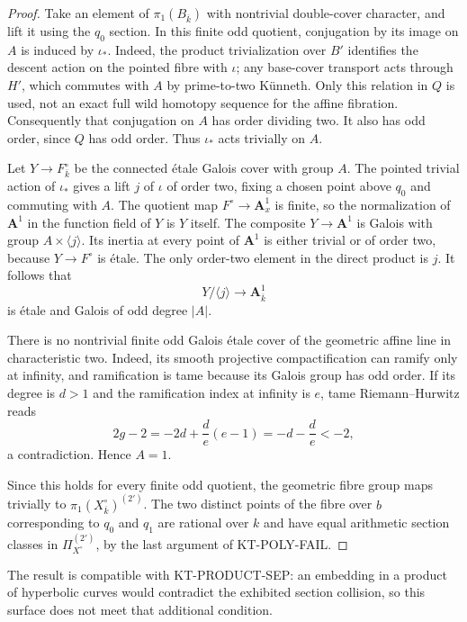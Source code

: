 \begin{proof}
Take an element of $\pi_1(B_{\overline k})$ with nontrivial
double-cover character, and lift it using the $q_0$ section.
In this finite odd quotient, conjugation by its image on $A$
is induced by $\iota_*$. Indeed, the product trivialization
over $B'$ identifies the descent action on the pointed fibre
with $\iota$; any base-cover transport acts through $H'$, which
commutes with $A$ by prime-to-two K\"unneth. Only this relation
in $Q$ is used, not an exact full wild homotopy sequence for
the affine fibration. Consequently that conjugation on $A$
has order dividing two. It also has odd order, since $Q$ has
odd order. Thus $\iota_*$ acts trivially on $A$.

Let $Y\to F^\circ_{\overline k}$ be the connected \'etale
Galois cover with group $A$. The pointed trivial action of
$\iota_*$ gives a lift $j$ of $\iota$ of order two, fixing a
chosen point above $q_0$ and commuting with $A$.
The quotient map $F^\circ\to\mathbf A^1_x$ is finite, so
the normalization of $\mathbf A^1$ in the function field of
$Y$ is $Y$ itself. The composite $Y\to\mathbf A^1$ is
Galois with group $A\times\langle j\rangle$. Its inertia
at every point of $\mathbf A^1$ is either trivial or of
order two, because $Y\to F^\circ$ is \'etale. The only
order-two element in the direct product is $j$.
It follows that
\[
 Y/\langle j\rangle\longrightarrow\mathbf A^1_{\overline k}
\]
is \'etale and Galois of odd degree $|A|$.

There is no nontrivial finite odd Galois \'etale cover of the
geometric affine line in characteristic two. Indeed, its
smooth projective compactification can ramify only at infinity,
and ramification is tame because its Galois group has odd order.
If its degree is $d>1$ and the ramification index at infinity
is $e$, tame Riemann--Hurwitz reads
\[
 2g-2=-2d+\frac d e(e-1)=-d-\frac d e<-2,
\]
a contradiction. Hence $A=1$.

Since this holds for every finite odd quotient, the geometric
fibre group maps trivially to
$\pi_1(X^\circ_{\overline k})^{(2')}$.
The two distinct points of the fibre over $b$ corresponding
to $q_0$ and $q_1$ are rational over $k$ and have equal
arithmetic section classes in $\Pi_{X^\circ}^{(2')}$,
by the last argument of KT-POLY-FAIL.
\end{proof}

The result is compatible with KT-PRODUCT-SEP: an embedding
in a product of hyperbolic curves would contradict the
exhibited section collision, so this surface does not meet
that additional condition.


